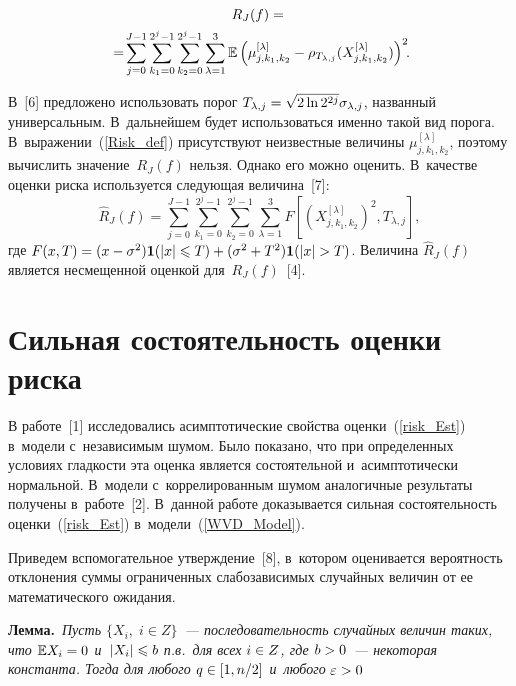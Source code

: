 \begin{multicols}{2}
\noindent
\begin{multline}    
R_J(f) = {}\\
\!\!\!{}=\!\sum\limits_{j = 0}^{J - 1}\sum\limits_{k_1=0}^{2^j-1}
\sum\limits_{k_2=0}^{2^j-1}\sum\limits_{\lambda=1}^3 
\Expect\left(\mu_{j,k_1,k_2}^{[\lambda]} -
 \rho_{T_{\lambda,j}}(X_{j,k_1,k_2}^{[\lambda]})\right)^2\!\!.\!\!\!
 \label{Risk_def}
\end{multline}

В~[6] предложено использовать порог $T_{\lambda,j} \hm= \sqrt{2\ln 2^{2j}}
\sigma_{\lambda,j}$, названный универсальным.
В~дальнейшем будет использоваться именно такой вид порога.
В~выражении~(\ref{Risk_def}) присутствуют неизвестные величины 
$\mu_{j,k_1,k_2}^{[\lambda]}$, поэтому вычислить значение~$R_J(f)$ нельзя.
Однако его можно оценить. В~качестве оценки риска используется следующая величина~[7]:
\begin{equation}                                                                                   
\label{risk_Est}
\widehat{R}_J (f) = \sum\limits_{j=0}^{J-1} \sum\limits_{k_1=0}^{2^j-1}
\sum\limits_{k_2=0}^{2^j-1} \sum\limits_{\lambda=1}^3 F[(X_{j,k_1,k_2}^{[\lambda]})^2,T_{\lambda,j}],
\end{equation}
где $F(x,T) \hm= (x - \sigma^2)\mathbf{1}(|x|\leqslant T) \hm+ 
(\sigma^2 \hm+ T^2)\mathbf{1}(|x|\hm>T)$.
Величина $\widehat{R}_J(f)$ является несмещенной оценкой для~$R_J(f)$~[4].

\section{Сильная состоятельность оценки риска}

В работе~[1] исследовались асимптотические свойства оценки~(\ref{risk_Est}) 
в~модели с~независимым шумом.
Было показано, что при определенных условиях гладкости эта оценка является 
состоятельной и~асимптотически нормальной. В~модели с~коррелированным шумом 
аналогичные результаты получены в~работе~[2]. В~данной работе доказывается 
сильная состоятельность оценки~(\ref{risk_Est}) в~модели~(\ref{WVD_Model}).

Приведем вспомогательное утверждение~[8], в~котором оценивается вероятность 
отклонения суммы ограниченных слабозависимых случайных величин от ее 
математического ожидания.

\smallskip

\noindent
\textbf{Лемма.}\ \textit{Пусть $\{X_i,\;i\in Z\}$~--- 
последовательность случайных величин таких, что $\Expect X_i\hm=0$ и~$\left\vert X_i\right\vert
\leqslant b$ п.в.\ для всех $i\hm\in Z$, где $b\hm>0$~--- 
некоторая константа. Тогда для любого $q\hm\in[1,n/2]$ и~любого} $\eps\hm>0$


\end{multicols}
